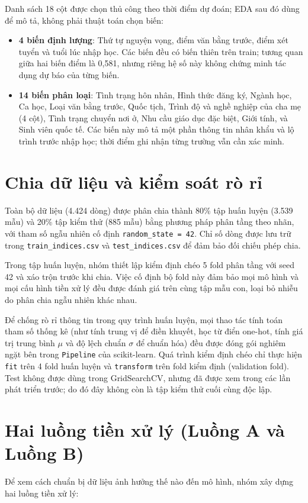 Danh sách 18 cột được chọn thủ công theo thời điểm dự đoán; EDA sau đó dùng để mô tả, không phải thuật toán chọn biến:
\begin{itemize}
    \item \textbf{4 biến định lượng}: Thứ tự nguyện vọng, điểm văn bằng trước, điểm xét tuyển và tuổi lúc nhập học. Các biến đều có biến thiên trên train; tương quan giữa hai biến điểm là 0,581, nhưng riêng hệ số này không chứng minh tác dụng dự báo của từng biến.
    \item \textbf{14 biến phân loại}: Tình trạng hôn nhân, Hình thức đăng ký, Ngành học, Ca học, Loại văn bằng trước, Quốc tịch, Trình độ và nghề nghiệp của cha mẹ (4 cột), Tình trạng chuyển nơi ở, Nhu cầu giáo dục đặc biệt, Giới tính, và Sinh viên quốc tế. Các biến này mô tả một phần thông tin nhân khẩu và lộ trình trước nhập học; thời điểm ghi nhận từng trường vẫn cần xác minh.
\end{itemize}

\section{Chia dữ liệu và kiểm soát rò rỉ}\label{sec:split}
Toàn bộ dữ liệu (4.424 dòng) được phân chia thành 80\% tập huấn luyện (3.539 mẫu) và 20\% tập kiểm thử (885 mẫu) bằng phương pháp phân tầng theo nhãn, với tham số ngẫu nhiên cố định \texttt{random\_state = 42}. Chỉ số dòng được lưu trữ trong \texttt{train\_indices.csv} và \texttt{test\_indices.csv} để đảm bảo đối chiếu phép chia.

Trong tập huấn luyện, nhóm thiết lập kiểm định chéo 5 fold phân tầng với seed 42 và xáo trộn trước khi chia. Việc cố định bộ fold này đảm bảo mọi mô hình và mọi cấu hình tiền xử lý đều được đánh giá trên cùng tập mẫu con, loại bỏ nhiễu do phân chia ngẫu nhiên khác nhau.

Để chống rò rỉ thông tin trong quy trình huấn luyện, mọi thao tác tính toán tham số thống kê (như tính trung vị để điền khuyết, học từ điển one-hot, tính giá trị trung bình $\mu$ và độ lệch chuẩn $\sigma$ để chuẩn hóa) đều được đóng gói nghiêm ngặt bên trong \texttt{Pipeline} của scikit-learn. Quá trình kiểm định chéo chỉ thực hiện \texttt{fit} trên 4 fold huấn luyện và \texttt{transform} trên fold kiểm định (validation fold). Test không được dùng trong GridSearchCV, nhưng đã được xem trong các lần phát triển trước; do đó đây không còn là tập kiểm thử cuối cùng độc lập.

\section{Hai luồng tiền xử lý (Luồng A và Luồng B)}
Để xem cách chuẩn bị dữ liệu ảnh hưởng thế nào đến mô hình, nhóm xây dựng hai luồng tiền xử lý:

